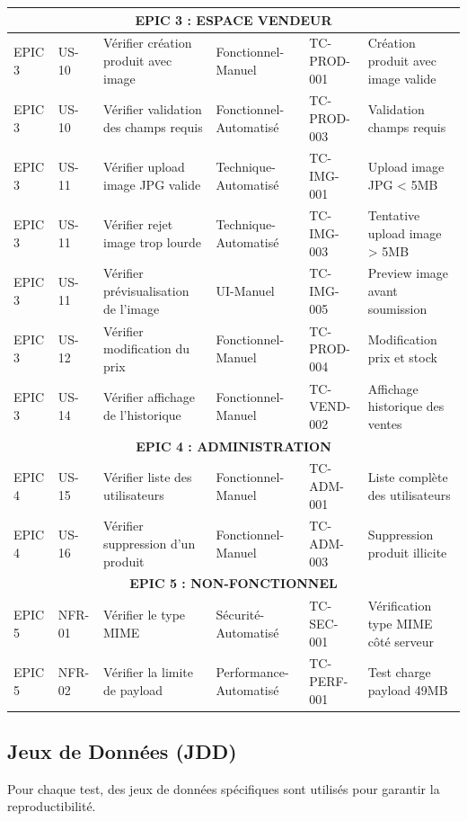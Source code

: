 \documentclass[12pt,a4paper]{article}
\begin{document}
\begin{longtable}{|p{2.5cm}|p{2cm}|p{3cm}|p{2cm}|p{1.5cm}|p{2.5cm}|}
    \multicolumn{6}{|c|}{\textbf{EPIC 3 : ESPACE VENDEUR}} \\ \hline
    
    EPIC 3 & US-10 & Vérifier création produit avec image & Fonctionnel-Manuel & TC-PROD-001 & Création produit avec image valide \\ \hline
    EPIC 3 & US-10 & Vérifier validation des champs requis & Fonctionnel-Automatisé & TC-PROD-003 & Validation champs requis \\ \hline
    EPIC 3 & US-11 & Vérifier upload image JPG valide & Technique-Automatisé & TC-IMG-001 & Upload image JPG < 5MB \\ \hline
    EPIC 3 & US-11 & Vérifier rejet image trop lourde & Technique-Automatisé & TC-IMG-003 & Tentative upload image > 5MB \\ \hline
    EPIC 3 & US-11 & Vérifier prévisualisation de l'image & UI-Manuel & TC-IMG-005 & Preview image avant soumission \\ \hline
    EPIC 3 & US-12 & Vérifier modification du prix & Fonctionnel-Manuel & TC-PROD-004 & Modification prix et stock \\ \hline
    EPIC 3 & US-14 & Vérifier affichage de l'historique & Fonctionnel-Manuel & TC-VEND-002 & Affichage historique des ventes \\ \hline
    
    \multicolumn{6}{|c|}{\textbf{EPIC 4 : ADMINISTRATION}} \\ \hline
    
    EPIC 4 & US-15 & Vérifier liste des utilisateurs & Fonctionnel-Manuel & TC-ADM-001 & Liste complète des utilisateurs \\ \hline
    EPIC 4 & US-16 & Vérifier suppression d'un produit & Fonctionnel-Manuel & TC-ADM-003 & Suppression produit illicite \\ \hline
    
    \multicolumn{6}{|c|}{\textbf{EPIC 5 : NON-FONCTIONNEL}} \\ \hline
    
    EPIC 5 & NFR-01 & Vérifier le type MIME & Sécurité-Automatisé & TC-SEC-001 & Vérification type MIME côté serveur \\ \hline
    EPIC 5 & NFR-02 & Vérifier la limite de payload & Performance-Automatisé & TC-PERF-001 & Test charge payload 49MB \\ \hline
\end{longtable}

\subsection{Jeux de Données (JDD)}
Pour chaque test, des jeux de données spécifiques sont utilisés pour garantir la reproductibilité.
\end{document}
